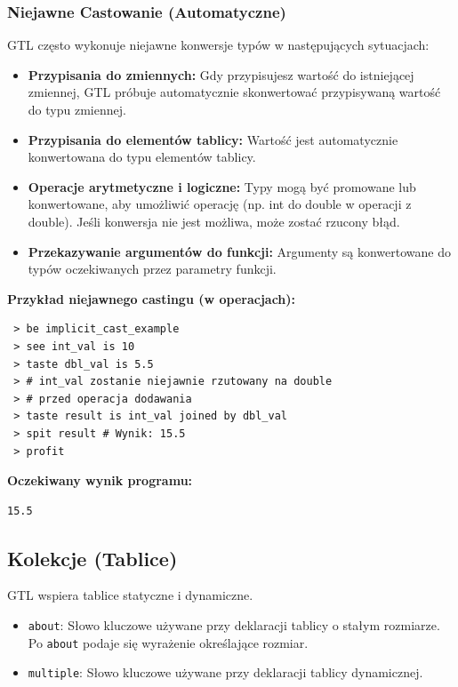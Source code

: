 \documentclass[12pt,a4paper]{article}
\begin{document}
\subsubsection{Niejawne Castowanie (Automatyczne)}
GTL często wykonuje niejawne konwersje typów w następujących sytuacjach:
\begin{itemize}
    \item \textbf{Przypisania do zmiennych:} Gdy przypisujesz wartość do istniejącej zmiennej, GTL próbuje automatycznie skonwertować przypisywaną wartość do typu zmiennej.
    \item \textbf{Przypisania do elementów tablicy:} Wartość jest automatycznie konwertowana do typu elementów tablicy.
    \item \textbf{Operacje arytmetyczne i logiczne:} Typy mogą być promowane lub konwertowane, aby umożliwić operację (np. int do double w operacji z double). Jeśli konwersja nie jest możliwa, może zostać rzucony błąd.
    \item \textbf{Przekazywanie argumentów do funkcji:} Argumenty są konwertowane do typów oczekiwanych przez parametry funkcji.
\end{itemize}
\textbf{Przykład niejawnego castingu (w operacjach):}
\begin{lstlisting}
 > be implicit_cast_example
 > see int_val is 10
 > taste dbl_val is 5.5
 > # int_val zostanie niejawnie rzutowany na double
 > # przed operacja dodawania
 > taste result is int_val joined by dbl_val
 > spit result # Wynik: 15.5
 > profit
\end{lstlisting}
\textbf{Oczekiwany wynik programu:}
\begin{verbatim}
15.5
\end{verbatim}

\subsection{Kolekcje (Tablice)}
GTL wspiera tablice statyczne i dynamiczne.
\begin{itemize}
    \item \texttt{about}: Słowo kluczowe używane przy deklaracji tablicy o stałym rozmiarze. Po \texttt{about} podaje się wyrażenie określające rozmiar.
    \item \texttt{multiple}: Słowo kluczowe używane przy deklaracji tablicy dynamicznej.
\end{itemize}
\end{document}
